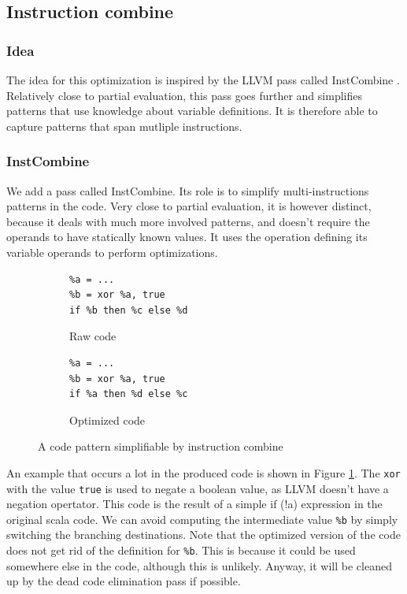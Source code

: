\documentclass[11pt,a4paper]{article}
\newcommand{\scala}[1]{\textsf{#1}}
\newcommand{\nir}[1]{\texttt{#1}}
\begin{document}
\subsection{Instruction combine}

\subsubsection*{Idea}

The idea for this optimization is inspired by the LLVM pass called \scala{InstCombine} \cite{llvm}. Relatively close to partial evaluation, this pass goes further and simplifies patterns that use knowledge about variable definitions. It is therefore able to capture patterns that span mutliple instructions.

\subsubsection*{InstCombine}

We add a pass called \scala{InstCombine}. Its role is to simplify multi-instructions patterns in the code. Very close to partial evaluation, it is however distinct, because it deals with much more involved patterns, and doesn't require the operands to have statically known values. It uses the operation defining its variable operands to perform optimizations.

\begin{figure}[h]
	\begin{subfigure}{0.5\textwidth}
		\begin{lstlisting}
%a = ...
%b = xor %a, true
if %b then %c else %d
		\end{lstlisting}
		\caption{Raw code}
	\end{subfigure}
	\quad
	\begin{subfigure}{0.5\textwidth}
		\begin{lstlisting}
%a = ...
%b = xor %a, true
if %a then %d else %c
		\end{lstlisting}
		\caption{Optimized code}
	\end{subfigure}
	\caption{A code pattern simplifiable by instruction combine}
	\label{fig:ic}
\end{figure}

An example that occurs a lot in the produced code is shown in Figure \ref{fig:ic}. The \nir{xor} with the value \nir{true} is used to negate a boolean value, as LLVM doesn't have a negation opertator. This code is the result of a simple \scala{if (!a)} expression in the original scala code. We can avoid computing the intermediate value \nir{\%b} by simply switching the branching destinations. Note that the optimized version of the code does not get rid of the definition for \nir{\%b}. This is because it could be used somewhere else in the code, although this is unlikely. Anyway, it will be cleaned up by the dead code elimination pass if possible.
\end{document}

